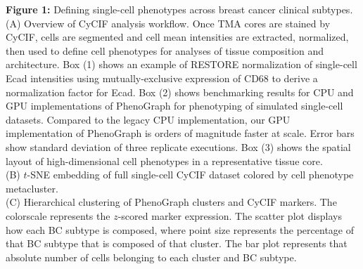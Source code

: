 \documentclass[preprint,review,3p,12pt]{elsarticle}
\begin{document}
\newpage

\noindent
\textbf{Figure 1:}  Defining single-cell phenotypes across breast cancer clinical subtypes.\\
(A) Overview of CyCIF analysis workflow. Once TMA cores are stained by CyCIF, cells are segmented and cell mean intensities are extracted, normalized, then used to define cell phenotypes for analyses of tissue composition and architecture. Box (1) shows an example of RESTORE normalization of single-cell Ecad intensities using mutually-exclusive expression of CD68 to derive a normalization factor for Ecad. Box (2) shows benchmarking results for CPU and GPU implementations of PhenoGraph for phenotyping of simulated single-cell datasets. Compared to the legacy CPU implementation, our GPU implementation of PhenoGraph is orders of magnitude faster at scale. Error bars show standard deviation of three replicate executions. Box (3) shows the spatial layout of high-dimensional cell phenotypes in a representative tissue core.\\
(B) $t$-SNE embedding of full single-cell CyCIF dataset colored by cell phenotype metacluster. \\
(C) Hierarchical clustering of PhenoGraph clusters and CyCIF markers. The colorscale represents the $z$-scored marker expression. The scatter plot displays how each BC subtype is composed, where point size represents the percentage of that BC subtype that is composed of that cluster. The bar plot represents that absolute number of cells belonging to each cluster and BC subtype.
\end{document}

